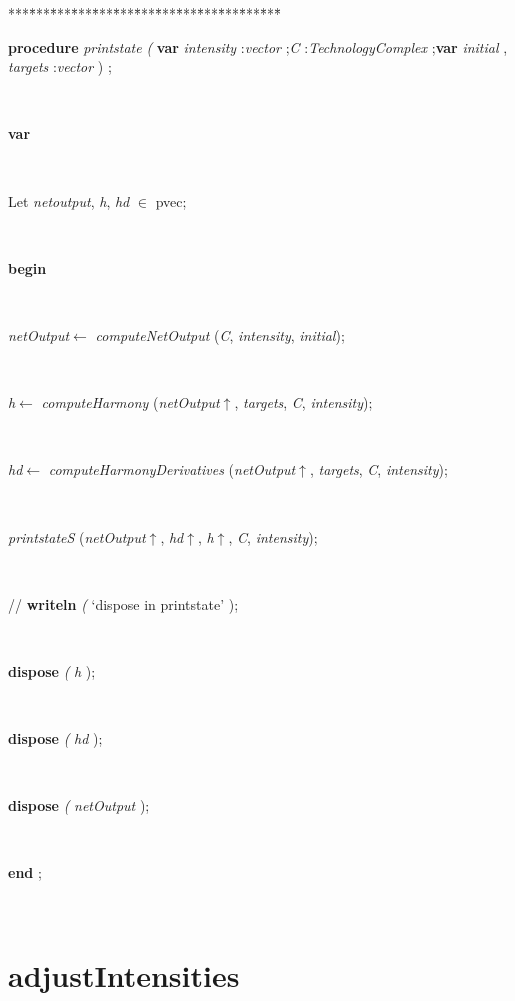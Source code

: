 \begin{tabbing}
***\=***\=***\=***\=***\=***\=***\=***\=***\=***\=***\=***\=***\=\kill
\parbox{14cm}{\textsf{\textbf{procedure}  \textit{printstate} \textit{(} \textbf{var}  \textit{intensity} :\textit{vector} ;\textit{C} :\textit{TechnologyComplex} ;\textbf{var}   \textit{initial} ,  \textit{targets} :\textit{vector} ) ;}}\\
\+\parbox{14cm}{\textsf{\textbf{var} }}\\
\parbox{14cm}{\textsf{Let \textit{netoutput}, \textit{h}, \textit{hd} $\in$ pvec;}}\\
\-\<\+\parbox{14cm}{\textsf{\textbf{begin} }}\\
\parbox{14cm}{\textsf{\textit{netOutput}$\leftarrow$ \textit{computeNetOutput} (\textit{C}, \textit{intensity}, \textit{initial})}; }\\
\parbox{14cm}{\textsf{\textit{h}$\leftarrow$ \textit{computeHarmony} (\textit{netOutput}$\uparrow$\textit{}, \textit{targets}, \textit{C}, \textit{intensity})}; }\\
\parbox{14cm}{\textsf{\textit{hd}$\leftarrow$ \textit{computeHarmonyDerivatives} (\textit{netOutput}$\uparrow$\textit{}, \textit{targets}, \textit{C}, \textit{intensity})}; }\\
\parbox{14cm}{\textsf{\textit{printstateS} (\textit{netOutput}$\uparrow$\textit{}, \textit{hd}$\uparrow$\textit{}, \textit{h}$\uparrow$\textit{}, \textit{C}, \textit{intensity})}; }\\
\parbox{14cm}{\textsf{//  \textbf{writeln} \textit{(} \textrm{\textup { `dispose in printstate' } });}}\\
\parbox{14cm}{\textsf{\textbf{dispose} \textit{(} \textit{h} );}}\\
\parbox{14cm}{\textsf{\textbf{dispose} \textit{(} \textit{hd} );}}\\
\parbox{14cm}{\textsf{\textbf{dispose} \textit{(} \textit{netOutput} );}}\\
\<\-\parbox{14cm}{\textsf{\textbf{end} ;}}\\
\end{tabbing}
\section{adjustIntensities}\label{sec:harmony/balancePlanadjustIntensities}

